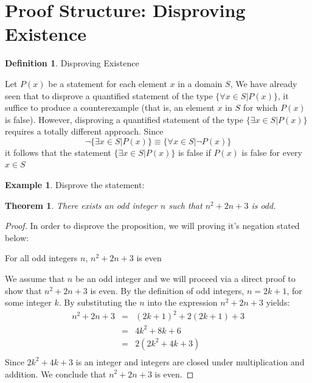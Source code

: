 \documentclass{book}
\newtheorem{theorem}{Theorem}[section]
\theoremstyle{definition}
\newtheorem{definition}{Definition}[section]
\newtheorem{example}{Example}[definition]
\theoremstyle{remark}
\begin{document}
\newpage
\section{Proof Structure: Disproving Existence}
\begin{definition}

Disproving Existence

Let $P(x)$ be a statement for each element $x$ in a domain $S$, We have already seen that to disprove a quantified statement  of the type $\{ \forall x \in S | P(x) \}$, it suffice to produce a counterexample (that is, an element $x$ in $S$ for which $P(x)$ is false). However, disproving a quantified statement of the type $\{ \exists x \in S | P(x) \}$ requires a totally different approach. Since
	\begin{equation}
		\neg \{ \exists x \in S | P(x) \} \equiv \{ \forall x \in S | \neg P(x) \}
	\end{equation}
it follows that the statement $\{ \exists x \in S | P(x) \}$ is false if $P(x)$ is false for every $x \in S$
\end{definition}


\begin{example}
Disprove the statement:

\begin{tcolorbox}
	\begin{theorem}
	\label{the2}		
		There exists an odd integer $n$ such that $n^2 + 2n + 3$ is odd. 
	\end{theorem}
\end{tcolorbox}

\begin{proof}
In order to disprove the proposition, we will proving it's negation stated below: \\
	\begin{center}
		For all odd integers $n$, $n^2 + 2n + 3$ is even
	\end{center}
We assume that $n$ be an odd integer and we will proceed via a direct proof to show that $n^2 + 2n + 3$ is even. By the definition of odd integers, $n = 2k + 1$, for some integer $k$. By substituting the $n$ into the expression $n^2 + 2n + 3$ yields:
	\begin{eqnarray*}
		n^2 + 2n + 3 & = & (2k + 1)^2 + 2(2k + 1) + 3 \nonumber \\
		& = & 4k^2 + 8k + 6 \nonumber \\
		& = & 2(2k^2 + 4k + 3) \nonumber \\
	\end{eqnarray*}	 
Since $2k^2 + 4k + 3$ is an integer and integers are closed under multiplication and addition. We conclude that $n^2 + 2n + 3$ is even. 
\end{proof}
\end{example}
\end{document}
